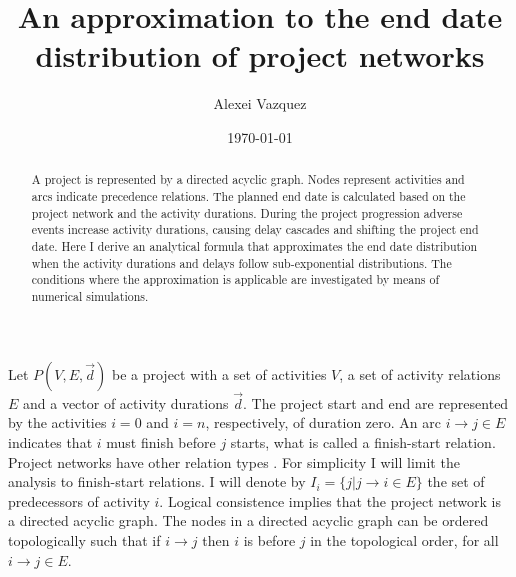 \documentclass[reprint,aps,prl,amsmath,amssymb,superscriptaddress,showpacs]{revtex4-1}
\begin{document}
\title{An approximation to the end date distribution of project networks}

\author{Alexei Vazquez}


\date{\today}

\begin{abstract}
A project is represented by a directed acyclic graph. Nodes represent activities and arcs indicate precedence relations. The planned end date is calculated based on the project network and the activity durations. During the project progression adverse events increase activity durations, causing delay cascades and shifting the project end date. Here I derive an analytical formula that approximates the end date distribution when the activity durations and delays follow sub-exponential distributions. The conditions where the approximation is applicable are investigated by means of numerical simulations.
\end{abstract}

\maketitle



Let $P(V,E,\vec{d})$ be a project with a set of activities $V$, a set of activity relations $E$ and a vector of activity durations $\vec{d}$. The project start and end are represented by the activities $i=0$ and $i=n$, respectively, of duration zero. An arc $i\rightarrow j\in E$ indicates that $i$ must finish before $j$ starts, what is called a finish-start relation. Project networks have other relation types \cite{van13}. For simplicity I will limit the analysis to finish-start relations. I will denote by $I_i=\{j|j\rightarrow i\in E\}$ the set of predecessors of activity $i$. Logical consistence implies that the project network is a directed acyclic graph.  The nodes in a directed acyclic graph can be ordered topologically such that if $i\rightarrow j$ then $i$ is before $j$ in the topological order, for all $i\rightarrow j\in E$.
\end{document}
